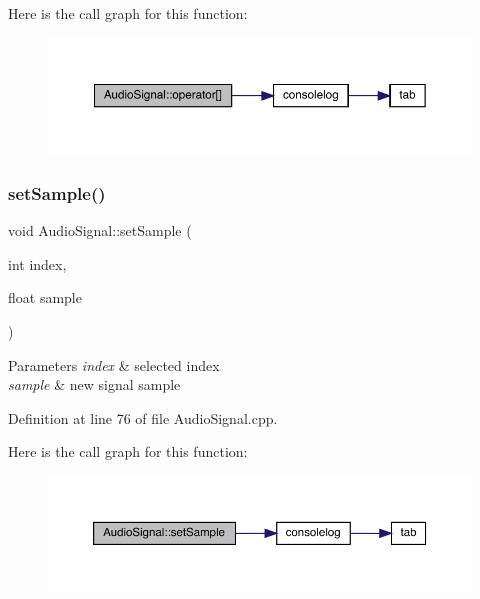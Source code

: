 Here is the call graph for this function\+:
\nopagebreak
\begin{figure}[H]
\begin{center}
\leavevmode
\includegraphics[width=350pt]{class_audio_signal_a92f6f979d43fe72d965e17b86dd82e79_cgraph}
\end{center}
\end{figure}
\mbox{\label{class_audio_signal_aeef099025639235c7f062294470a691f}} 
\subsubsection{\texorpdfstring{set\+Sample()}{setSample()}}
{\footnotesize\ttfamily void Audio\+Signal\+::set\+Sample (\begin{DoxyParamCaption}\item[{int}]{index,  }\item[{float}]{sample }\end{DoxyParamCaption})}


\begin{DoxyParams}{Parameters}
{\em index} & selected index \\
\hline
{\em sample} & new signal sample \\
\hline
\end{DoxyParams}


Definition at line 76 of file Audio\+Signal.\+cpp.

Here is the call graph for this function\+:
\nopagebreak
\begin{figure}[H]
\begin{center}
\leavevmode
\includegraphics[width=350pt]{class_audio_signal_aeef099025639235c7f062294470a691f_cgraph}
\end{center}
\end{figure}
\mbox{\label{class_audio_signal_a90eda59db04d3b18bd1949b8fa9e9c81}} 
